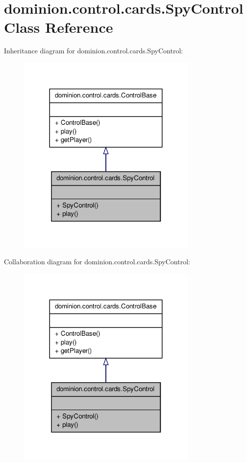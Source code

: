 \hypertarget{classdominion_1_1control_1_1cards_1_1SpyControl}{\section{dominion.\-control.\-cards.\-Spy\-Control \-Class \-Reference}
\label{classdominion_1_1control_1_1cards_1_1SpyControl}
}


\-Inheritance diagram for dominion.\-control.\-cards.\-Spy\-Control\-:
\nopagebreak
\begin{figure}[H]
\begin{center}
\leavevmode
\includegraphics[width=252pt]{classdominion_1_1control_1_1cards_1_1SpyControl__inherit__graph}
\end{center}
\end{figure}


\-Collaboration diagram for dominion.\-control.\-cards.\-Spy\-Control\-:
\nopagebreak
\begin{figure}[H]
\begin{center}
\leavevmode
\includegraphics[width=252pt]{classdominion_1_1control_1_1cards_1_1SpyControl__coll__graph}
\end{center}
\end{figure}
